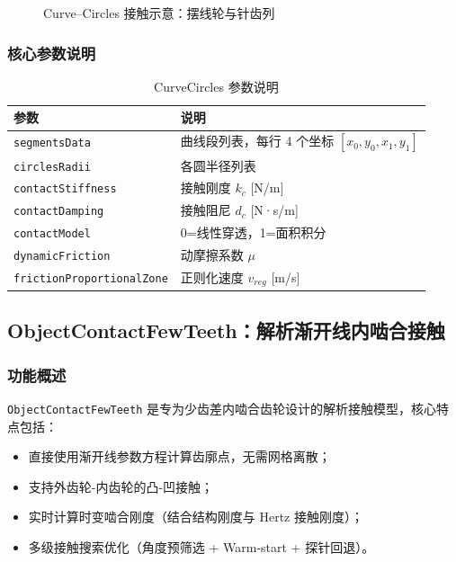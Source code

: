 \documentclass[12pt]{ctexart}
\begin{document}
\begin{figure}[htbp]
\centering
{}
\caption{Curve--Circles 接触示意：摆线轮与针齿列}
\end{figure}

\subsubsection{核心参数说明}

\begin{table}[htbp]
\centering
\small
\begin{tabular}{lp{8cm}}
\toprule
参数 & 说明 \\ 
\midrule
\verb|segmentsData| & 曲线段列表，每行 4 个坐标 $[x_0, y_0, x_1, y_1]$ \\ 
\verb|circlesRadii| & 各圆半径列表 \\ 
\verb|contactStiffness| & 接触刚度 $k_c$ [N/m] \\ 
\verb|contactDamping| & 接触阻尼 $d_c$ [N·s/m] \\ 
\verb|contactModel| & 0=线性穿透，1=面积积分 \\ 
\verb|dynamicFriction| & 动摩擦系数 $\mu$ \\ 
\verb|frictionProportionalZone| & 正则化速度 $v_{reg}$ [m/s] \\ 
\bottomrule
\end{tabular}
\caption{CurveCircles 参数说明}
\end{table}

\subsection{ObjectContactFewTeeth：解析渐开线内啮合接触}

\subsubsection{功能概述}

\texttt{ObjectContactFewTeeth} 是专为少齿差内啮合齿轮设计的解析接触模型，核心特点包括：
\begin{itemize}
  \item 直接使用渐开线参数方程计算齿廓点，无需网格离散；
  \item 支持外齿轮-内齿轮的凸-凹接触；
  \item 实时计算时变啮合刚度（结合结构刚度与 Hertz 接触刚度）；
  \item 多级接触搜索优化（角度预筛选 + Warm-start + 探针回退）。
\end{itemize}
\end{document}
